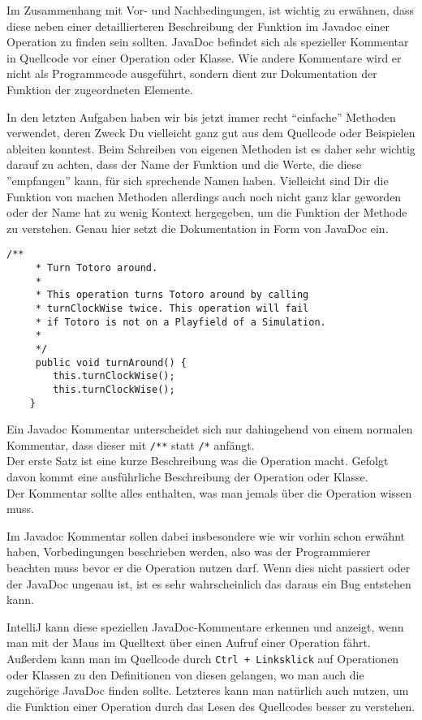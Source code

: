 \begin{Infobox}[JavaDoc]
    Im Zusammenhang mit Vor- und Nachbedingungen, ist wichtig zu erwähnen, dass diese neben einer detaillierteren Beschreibung der Funktion im Javadoc einer Operation zu finden sein sollten.
JavaDoc befindet sich als spezieller Kommentar in Quellcode vor einer Operation oder Klasse.
Wie andere Kommentare wird er nicht als Programmcode ausgeführt, sondern dient zur Dokumentation der Funktion der zugeordneten Elemente.

In den letzten Aufgaben haben wir bis jetzt immer recht \enquote{einfache} Methoden verwendet, deren Zweck Du vielleicht ganz gut aus dem Quellcode oder Beispielen ableiten konntest.
Beim Schreiben von eigenen Methoden ist es daher sehr wichtig darauf zu achten, dass der Name der Funktion und die Werte, die diese ''empfangen'' kann, für sich sprechende Namen haben.
Vielleicht sind Dir die Funktion von machen Methoden allerdings auch noch nicht ganz klar geworden oder der Name hat zu wenig Kontext hergegeben, um die Funktion der Methode
zu verstehen.
Genau hier setzt die Dokumentation in Form von JavaDoc ein.

    \begin{lstlisting}[numbers=none]
    /**
     * Turn Totoro around.
     *
     * This operation turns Totoro around by calling
     * turnClockWise twice. This operation will fail 
     * if Totoro is not on a Playfield of a Simulation.
     *
     */
     public void turnAround() {
        this.turnClockWise();
        this.turnClockWise();
    }
    \end{lstlisting}

    Ein Javadoc Kommentar unterscheidet sich nur dahingehend von einem normalen Kommentar, dass dieser mit \lstinline{/**} statt \lstinline{/*} anfängt.\\

Der erste Satz ist eine kurze Beschreibung was die Operation macht.
Gefolgt davon kommt eine ausführliche Beschreibung der Operation oder Klasse.\\

Der Kommentar sollte alles enthalten, was man jemals über die Operation wissen muss.

Im Javadoc Kommentar sollen dabei insbesondere wie wir vorhin schon erwähnt haben, Vorbedingungen beschrieben werden, also was der Programmierer beachten muss bevor er die Operation nutzen darf.
Wenn dies nicht passiert oder der JavaDoc ungenau ist, ist es sehr wahrscheinlich das daraus ein Bug entstehen kann.

IntelliJ kann diese speziellen JavaDoc-Kommentare erkennen und anzeigt, wenn man mit der Maus im Quelltext über einen Aufruf einer Operation fährt.
Außerdem kann man im Quellcode durch \lstinline{Ctrl + Linksklick} auf Operationen oder Klassen zu den Definitionen von diesen gelangen, wo man auch die zugehörige JavaDoc finden sollte.
Letzteres kann man natürlich auch nutzen, um die Funktion einer Operation durch das Lesen des Quellcodes besser zu verstehen.
\end{Infobox}

